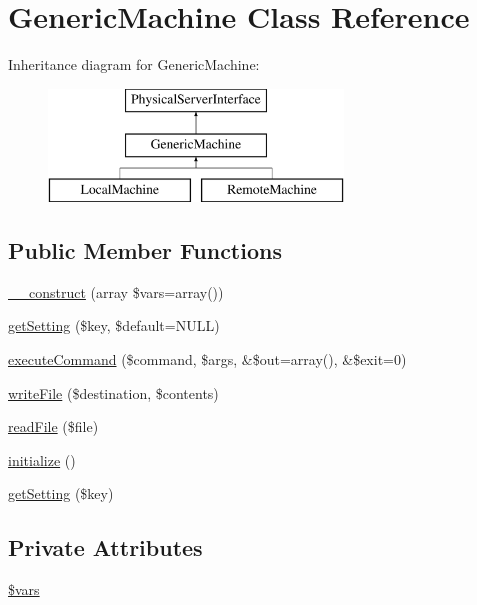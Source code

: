 \hypertarget{classGenericMachine}{\section{Generic\-Machine Class Reference}
\label{classGenericMachine}
}
Inheritance diagram for Generic\-Machine\-:\begin{figure}[H]
\begin{center}
\leavevmode
\includegraphics[height=3.000000cm]{classGenericMachine}
\end{center}
\end{figure}
\subsection*{Public Member Functions}
\begin{DoxyCompactItemize}
\item 
\hyperlink{classGenericMachine_a4bfd031ebe5ab6ea73e888824b62a413}{\-\_\-\-\_\-construct} (array \$vars=array())
\item 
\hyperlink{classGenericMachine_ae4e9eb3e4e7809afe0151d3435a927f9}{get\-Setting} (\$key, \$default=N\-U\-L\-L)
\item 
\hyperlink{interfacePhysicalServerInterface_a15565cb4469f6ccfc53167d60280a69e}{execute\-Command} (\$command, \$args, \&\$out=array(), \&\$exit=0)
\item 
\hyperlink{interfacePhysicalServerInterface_ad4488de39c860dc5b8d868c89d90a58f}{write\-File} (\$destination, \$contents)
\item 
\hyperlink{interfacePhysicalServerInterface_a6845be492b00e24879f3f48ea7780374}{read\-File} (\$file)
\item 
\hyperlink{interfacePhysicalServerInterface_ab17bfdfe9efdc4caf982f8e9b127e034}{initialize} ()
\item 
\hyperlink{interfacePhysicalServerInterface_a86167983d096e7dd41f7a4007774d0cb}{get\-Setting} (\$key)
\end{DoxyCompactItemize}
\subsection*{Private Attributes}
\begin{DoxyCompactItemize}
\item 
\hyperlink{classGenericMachine_af324c6289de0c6213ac3380d2f1cb827}{\$vars}
\end{DoxyCompactItemize}


